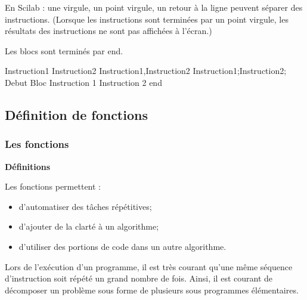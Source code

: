 \documentclass[10pt]{article}
\begin{document}
\begin{exemple}
\begin{minipage}[c]{.47\linewidth}
En Scilab : une virgule, un point virgule, un retour à la ligne peuvent séparer des instructions. (Lorsque les instructions sont terminées par un point virgule, les résultats des instructions ne sont pas affichées à l'écran.)

Les blocs sont terminés par \textsf{end}.
\end{minipage}\hfill
\begin{minipage}[c]{.47\linewidth}
\begin{sci}
\begin{scilab}
Instruction1
Instruction2
Instruction1,Instruction2
Instruction1;Instruction2;
Debut Bloc
Instruction 1
Instruction 2
end
\end{scilab}
\end{sci}
\end{minipage}


\end{exemple}


\subsection{Définition de fonctions}
\subsubsection{Les fonctions}
\begin{defi}
\textbf{Définitions}

Les fonctions permettent :
\begin{itemize}
\item d’automatiser des tâches répétitives;
\item d’ajouter de la clarté à un algorithme;
\item d’utiliser des portions de code dans un autre algorithme.
\end{itemize}
\end{defi}
Lors de l'exécution d'un programme, il est très courant qu'une même séquence d'instruction soit répété un grand nombre de fois. Ainsi, il est courant de décomposer un problème sous forme de plusieurs sous programmes élémentaires. 


\end{document}
